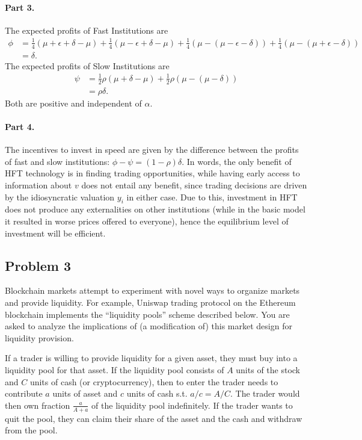 \begin{solution}
	\paragraph{Part 3.}
	The expected profits of Fast Institutions are
	\begin{align*}
		\phi &= \frac{1}{4} (\mu + \epsilon + \delta - \mu) + \frac{1}{4} (\mu - \epsilon + \delta - \mu) + \frac{1}{4} (\mu - (\mu - \epsilon - \delta)) + \frac{1}{4} (\mu - (\mu + \epsilon - \delta))
		\\
		&= \delta.
	\end{align*}
	The expected profits of Slow Institutions are
	\begin{align*}
		\psi &= \frac{1}{2} \rho (\mu+\delta - \mu) + \frac{1}{2} \rho (\mu - (\mu - \delta))
		\\
		&= \rho \delta.
	\end{align*}
	Both are positive and independent of $\alpha$.
	
	
	\paragraph{Part 4.}
	The incentives to invest in speed are given by the difference between the profits of fast and slow institutions: $\phi - \psi = (1-\rho) \delta$. In words, the only benefit of HFT technology is in finding trading opportunities, while having early access to information about $v$ does not entail any benefit, since trading decisions are driven by the idiosyncratic valuation $y_i$ in either case. Due to this, investment in HFT does not produce any externalities on other institutions (while in the basic model it resulted in worse prices offered to everyone), hence the equilibrium level of investment will be efficient.
\end{solution}




\quad
\subsection*{Problem 3}
	Blockchain markets attempt to experiment with novel ways to organize markets and provide liquidity. For example, Uniswap trading protocol on the Ethereum blockchain implements the ``liquidity pools'' scheme described below. You are asked to analyze the implications of (a modification of) this market design for liquidity provision.
	
	If a trader is willing to provide liquidity for a given asset, they must buy into a liquidity pool for that asset. If the liquidity pool consists of $A$ units of the stock and $C$ units of cash (or cryptocurrency), then to enter the trader needs to contribute $a$ units of asset and $c$ units of cash s.t. $a/c = A/C$. The trader would then own fraction $\frac{a}{A+a}$ of the liquidity pool indefinitely. If the trader wants to quit the pool, they can claim their share of the asset and the cash and withdraw from the pool.
	
